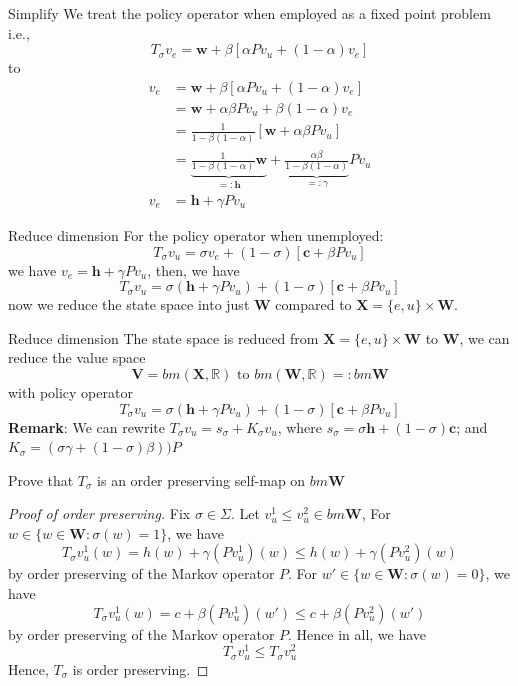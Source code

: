 \documentclass[aspectratio=169]{beamer} %
\begin{document}
\begin{frame}{Simplify}
    We treat the policy operator when employed as a fixed point problem i.e.,
    $$
    T_\sigma v_e= \mathbf{w}+\beta\left[\alpha Pv_u + (1-\alpha) v_e\right]
    $$
    to
    \begin{align*}
        v_e &= \mathbf{w}+\beta\left[\alpha Pv_u + (1-\alpha) v_e\right]\\
        &= \mathbf{w} + \alpha\beta Pv_u + \beta(1-\alpha) v_e\\
        &= \frac{1}{1-\beta(1-\alpha)}[\mathbf{w}+ \alpha\beta Pv_u]\\
        &= \underbrace{\frac{1}{1-\beta(1-\alpha)}\mathbf{w}}_{=:\mathbf{h}} + \underbrace{\frac{\alpha\beta}{1-\beta(1-\alpha)}}_{=:\gamma}Pv_u\\
        v_e&= \mathbf{h}+ \gamma Pv_u\tag{a relation between $v_e$ and $v_u$}
    \end{align*}
\end{frame}
\begin{frame}{Reduce dimension}
For the policy operator when unemployed:
    $$
    T_\sigma v_u = \sigma v_e + (1-\sigma)\left[\mathbf{c}+\beta Pv_u\right]
    $$
    we have $v_e = \mathbf{h} + \gamma P v_u$, then, we have
    $$
    T_\sigma v_u = \sigma(\mathbf{h}+\gamma Pv_u) + (1-\sigma) [\mathbf{c} + \beta P v_u]
    $$
    now we reduce the state space into just $\mathbf{W}$ compared to $\mathbf{X}= \{e,u\}\times \mathbf{W}$.
\end{frame}
\begin{frame}{Reduce dimension}
The state space is reduced from $\mathbf{X}=\{e,u\}\times \mathbf{W}$ to $\mathbf{W}$, we can reduce the value space
$$
\mathbf{V} = bm(\mathbf{X},\mathbb{R}) \text{  to  $bm(\mathbf{W},\mathbb{R})=: bm\mathbf{W}$}
$$
with policy operator
$$
T_\sigma v_u = \sigma(\mathbf{h}+\gamma Pv_u) + (1-\sigma) [\mathbf{c} + \beta P v_u]
$$
\textbf{Remark}: We can rewrite $T_\sigma v_u = s_\sigma + K_\sigma v_u$, where $s_\sigma  = \sigma \mathbf{h} + (1-\sigma)\mathbf{c}$; and $K_\sigma  = (\sigma \gamma +(1-\sigma) \beta))P$
\end{frame}

\begin{frame}{Prove that $T_\sigma$ is an order preserving self-map on $bm\mathbf{W}$}
\begin{proof}[Proof of order preserving]
Fix $\sigma\in\Sigma$. Let $v_u^1\le v_u^2\in bm\mathbf{W}$, For $w\in \{w\in \mathbf{W}: \sigma(w) =1\}$, we have
$$
T_\sigma v_u^1(w) = h(w)+\gamma (Pv_u^1)(w) \le h(w) + \gamma (Pv_u^2)(w)
$$
by order preserving of the Markov operator $P$. For $w'\in \{w\in \mathbf{W}: \sigma(w)=0\}$, we have
$$
T_\sigma v_u^1(w) = c + \beta (Pv_u^1)(w')\le c+\beta(Pv_u^2)(w')
$$
by order preserving of the Markov operator $P$. Hence in all, we have
$$
T_\sigma v_u^1\le T_\sigma v_u^2
$$
Hence, $T_\sigma$ is order preserving.
\end{proof}
    
\end{frame}
\end{document}
